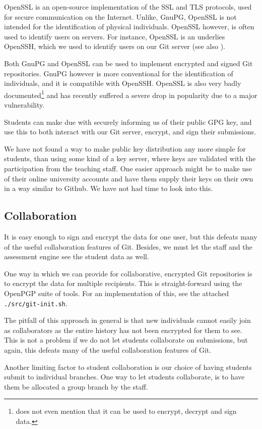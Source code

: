 OpenSSL is an open-source implementation of the SSL and TLS protocols, used for
secure communication on the Internet. Unlike, GnuPG, OpenSSL is not intended
for the identification of physical individuals. OpenSSL however, is often used
to identify users on servers. For instance, OpenSSL is an underlies OpenSSH,
which we used to identify users on our Git server (see also
).

Both GnuPG and OpenSSL can be used to implement encrypted and signed Git
repositories. GnuPG however is more conventional for the identification of
individuals, and it is compatible with OpenSSH\cite{man-1-gpg-agent}. OpenSSL
is also very badly documented\footnote{\cite{man-1-openssl} does not even
mention that it can be used to encrypt, decrypt and sign data.} and has
recently suffered a severe drop in popularity due to a major
vulnerability\cite{cvedetails-com-2014c}.

Students can make due with securely informing us of their public GPG key, and
use this to both interact with our Git server, encrypt, and sign their
submissions.

We have not found a way to make public key distribution any more simple for
students, than using some kind of a key server, where keys are validated with
the participation from the teaching staff. One easier approach might be to make
use of their online university accounts and have them supply their keys on
their own in a way similar to Github. We have not had time to look into this.

\subsection{Collaboration}

It is easy enough to sign and encrypt the data for one user, but this defeats
many of the useful collaboration features of Git. Besides, we must let the
staff and the assessment engine see the student data as well.

One way in which we can provide for collaborative, encrypted Git repositories
is to encrypt the data for multiple recipients. This is straight-forward using
the OpenPGP suite of tools\cite{man-1-gpg2}. For an implementation of this, see
the attached \texttt{./src/git-init.sh}.

The pitfall of this approach in general is that new individuals cannot easily
join as collaborators as the entire history has not been encrypted for them to
see.  This is not a problem if we do not let students collaborate on
submissions, but again, this defeats many of the useful collaboration features
of Git.


Another limiting factor to student collaboration is our choice of having
students submit to individual branches. One way to let students collaborate, is
to have them be allocated a group branch by the staff.
